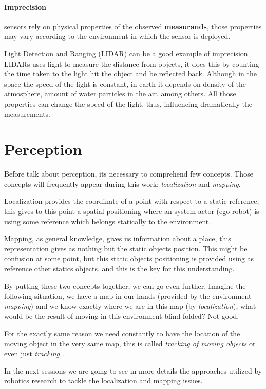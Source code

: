 \paragraph{Imprecision} sensors rely on physical properties of the observed \textbf{measurands}, those properties may vary according to the environment in which the sensor is deployed.

Light Detection and Ranging (LIDAR) can be a good example of imprecision. LIDARs uses light to measure the distance from objects, it does this by counting the time taken to the light hit the object and be reflected back. Although in the space the speed of the light is constant, in earth it depends on density of the atmosphere, amount of water particles in the air, among others. All those properties can change the speed of the light, thus, influencing dramatically the measurements.

\section{Perception}

Before talk about perception, its necessary to comprehend few concepts. Those concepts will frequently appear during this work: \textit{localization} and \textit{mapping}.

Localization provides the coordinate of a point with respect to a static reference, this gives to this point a spatial positioning where an system actor (ego-robot) is using some reference which belongs statically to the environment.  

Mapping, as general knowledge, gives us information about a place, this representation gives as nothing but the static objects position. This might be confusion at some point, but this static objects positioning is provided using as reference other statics objects, and this is the key for this understanding.

By putting these two concepts together, we can go even further. Imagine the following situation, we have a map in our hands (provided by the environment \textit{mapping}) and we know exactly where we are in this map (by \textit{localization}), what would be the result of moving in this environment blind folded? Not good.

For the exactly same reason we need constantly to have the location of the moving object in the very same map, this is called \textit{tracking of moving objects} or even just \textit{tracking} \cite{Wang04a}.

In the next sessions we are going to see in more details the approaches utilized by robotics research to tackle the localization and mapping issues.

